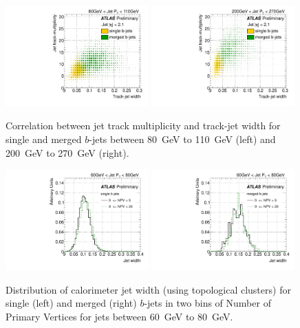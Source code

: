 \begin{figure}[tp]
\centering
\includegraphics[width=0.49\textwidth]{FIGS/VarsSingleMerged/NtrktrkWidth080.pdf}
\includegraphics[width=0.49\textwidth]{FIGS/VarsSingleMerged/NtrktrkWidth200.pdf}
\caption{Correlation between jet track multiplicity and track-jet width for single and merged $b$-jets between 80~GeV to 110~GeV (left) and 200~GeV to 270~GeV (right).}
\label{fig:ntrktrkwidthsinglemerged}
\end{figure}



\begin{figure}[tp]
\centering
\includegraphics[width=0.49\textwidth]{FIGS/systematics/Widthsingle_060.pdf}
\includegraphics[width=0.49\textwidth]{FIGS/systematics/Widthmerged_060.pdf}
\caption{Distribution of calorimeter jet width (using topological clusters) for single (left) and merged (right) $b$-jets in two bins of Number of Primary Vertices for jets between 60~GeV to 80~GeV.}
\label{fig:calowidthpileup}
\end{figure}


